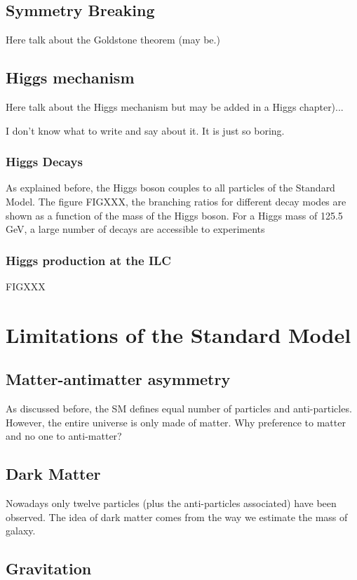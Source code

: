     \subsection{Symmetry Breaking}

    Here talk about the Goldstone theorem (may be.)

    \subsection{Higgs mechanism}

    Here talk about the Higgs mechanism but may be added in a Higgs chapter)...

    I don't know what to write and say about it. It is just so boring.


     \subsubsection{Higgs Decays}

     As explained before, the Higgs boson couples to all particles of the Standard Model.
     The figure FIGXXX, the branching ratios for different decay modes are shown as a function of the mass of the Higgs boson.
     For a Higgs mass of 125.5 GeV, a large number of decays are accessible to experiments

     \subsubsection{Higgs production at the ILC}

     FIGXXX
      
  \section{Limitations of the Standard Model}

    \subsection{Matter-antimatter asymmetry}

    As discussed before, the SM defines equal number of particles and anti-particles. 
    However, the entire universe is only made of matter. 
    Why preference to matter and no one to anti-matter? 

    \subsection{Dark Matter}
    
        Nowadays only twelve particles (plus the anti-particles associated) have been observed. 
        The idea of dark matter comes from the way we estimate the mass of galaxy.

    \subsection{Gravitation}         



